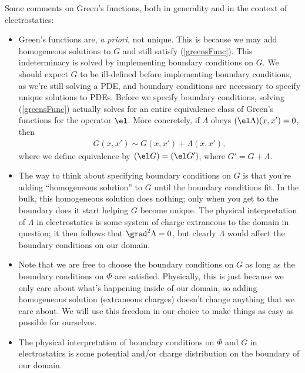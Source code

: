 \documentclass[11pt]{article}
\begin{document}
Some comments on Green's functions, both in generality
and in the context of electrostatics:
\begin{itemize}
    \item Green's functions are, \emph{a priori}, not unique. This is because
    we may add homogeneous solutions to $G$ and still satisfy (\ref{greensFunc}).
    This indeterminacy is solved by implementing boundary conditions on $G$. We should
    expect $G$ to be ill-defined before implementing boundary conditions,
    as we're still solving a PDE, and boundary conditions are necessary to specify 
    unique solutions to PDEs. Before we specify boundary conditions, solving (\ref{greensFunc})
    actually solves for an entire equivalence class of Green's functions
    for the operator $\el$. More concretely, if $\Lambda$ obeys $(\el \Lambda)(x, x') = 0$,
    then
    \begin{align*}
        G(x, x') \sim G(x, x') + \Lambda(x, x'),
    \end{align*}
    where we define equivalence by $(\el G) = (\el G')$,
    where $G' = G + \Lambda$.
    \item The way to think about specifying boundary conditions on $G$ is that you're
    adding ``homogeneous solution'' to $G$ until the boundary conditions
    fit. In the bulk, this homogeneous solution does nothing; only when
    you get to the boundary does it start helping $G$ become unique. The
    physical interpretation of $\Lambda$ in electrostatics is some system of charge
    extraneous to the domain in question; it then follows that $\grad^2 \Lambda = 0$,
    but clearly $\Lambda$ would affect the boundary conditions on our
    domain.
    \item Note that we are free to choose the boundary conditions on $G$
    as long as the boundary conditions on $\Phi$ are satisfied. Physically, this is
    just because we only care about what's happening inside of our domain,
    so adding homogeneous solution (extraneous charges) doesn't change anything
    that we care about. We will use this freedom in our choice to make
    things as easy as possible for ourselves. 
    \item The physical interpretation of boundary conditions on $\Phi$
    and $G$ in electrostatics is some potential and/or charge distribution
    on the boundary of our domain. 
\end{itemize}
\end{document}
